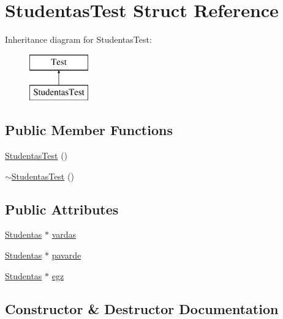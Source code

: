 \hypertarget{struct_studentas_test}{}\section{Studentas\+Test Struct Reference}
\label{struct_studentas_test}
Inheritance diagram for Studentas\+Test\+:\begin{figure}[H]
\begin{center}
\leavevmode
\includegraphics[height=2.000000cm]{struct_studentas_test}
\end{center}
\end{figure}
\subsection*{Public Member Functions}
\begin{DoxyCompactItemize}
\item 
\mbox{\hyperlink{struct_studentas_test_afeedf1686c645977e0aba4aab3d05241}{Studentas\+Test}} ()
\item 
\mbox{\hyperlink{struct_studentas_test_a4187afae5e82ae547ebda520d07fed8e}{$\sim$\+Studentas\+Test}} ()
\end{DoxyCompactItemize}
\subsection*{Public Attributes}
\begin{DoxyCompactItemize}
\item 
\mbox{\hyperlink{class_studentas}{Studentas}} $\ast$ \mbox{\hyperlink{struct_studentas_test_a4335c9cb4510f1493b4d702210b37bd6}{vardas}}
\item 
\mbox{\hyperlink{class_studentas}{Studentas}} $\ast$ \mbox{\hyperlink{struct_studentas_test_adbe0d0678d35de4a25a56abf97d8a743}{pavarde}}
\item 
\mbox{\hyperlink{class_studentas}{Studentas}} $\ast$ \mbox{\hyperlink{struct_studentas_test_aeb1bd2d7d47a4cb4e17c276732a18960}{egz}}
\end{DoxyCompactItemize}


\subsection{Constructor \& Destructor Documentation}
\mbox{\label{struct_studentas_test_afeedf1686c645977e0aba4aab3d05241}} 
